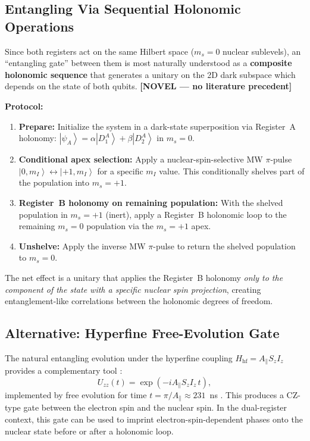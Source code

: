\documentclass[11pt,letterpaper]{article}
\newcommand{\ket}[1]{\left|#1\right\rangle}
\newcommand{\novel}{\textcolor{purple!70!black}{\textbf{[NOVEL --- no literature precedent]}}}
\begin{document}
\subsection{Entangling Via Sequential Holonomic Operations}

Since both registers act on the same Hilbert space ($m_s = 0$ nuclear sublevels), an ``entangling gate'' between them is most naturally understood as a \textbf{composite holonomic sequence} that generates a unitary on the 2D dark subspace which depends on the state of both qubits. \novel

\medskip
\noindent\textbf{Protocol:}
\begin{enumerate}[leftmargin=*]
    \item \textbf{Prepare:} Initialize the system in a dark-state superposition via Register~A holonomy: $\ket{\psi_A} = \alpha\ket{D_1^A} + \beta\ket{D_2^A}$ in $m_s = 0$.
    \item \textbf{Conditional apex selection:} Apply a nuclear-spin-selective MW $\pi$-pulse $\ket{0, m_I} \leftrightarrow \ket{+1, m_I}$ for a specific $m_I$ value. This conditionally shelves part of the population into $m_s = +1$.
    \item \textbf{Register~B holonomy on remaining population:} With the shelved population in $m_s = +1$ (inert), apply a Register~B holonomic loop to the remaining $m_s = 0$ population via the $m_s = +1$ apex.
    \item \textbf{Unshelve:} Apply the inverse MW $\pi$-pulse to return the shelved population to $m_s = 0$.
\end{enumerate}

\noindent The net effect is a unitary that applies the Register~B holonomy \emph{only to the component of the state with a specific nuclear spin projection}, creating entanglement-like correlations between the holonomic degrees of freedom.

\subsection{Alternative: Hyperfine Free-Evolution Gate}

The natural entangling evolution under the hyperfine coupling $H_\mathrm{hf} = A_\parallel S_z I_z$ provides a complementary tool \cite{Nagata2018}:
\begin{equation}
    U_{zz}(t) = \exp(-i A_\parallel S_z I_z \, t),
\end{equation}
implemented by free evolution for time $t = \pi / A_\parallel \approx 231$~ns \cite{Nagata2018}. %
This produces a CZ-type gate between the electron spin and the nuclear spin. In the dual-register context, this gate can be used to imprint electron-spin-dependent phases onto the nuclear state before or after a holonomic loop.
\end{document}
